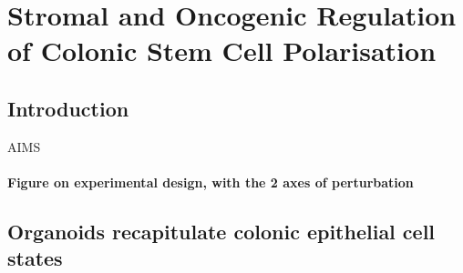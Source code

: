 \chapter{Stromal and Oncogenic Regulation of Colonic Stem Cell Polarisation}
\label{04seq}

\section{Introduction}


AIMS

\subsubsection{Figure on experimental design, with the 2 axes of perturbation}

\section{Organoids recapitulate colonic epithelial cell states}

